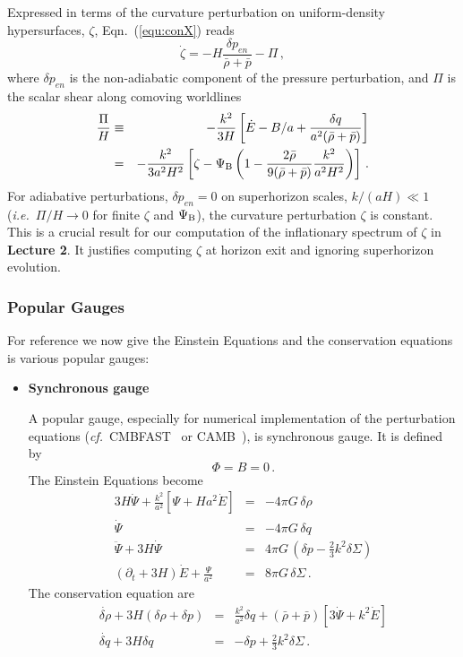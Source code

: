 \documentclass[12pt,letterpaper,rotate]{article}
\def\beq{\begin{equation}}
\def\eeq{\end{equation}}
\begin{document}
{Expressed in terms of the curvature perturbation on uniform-density hypersurfaces, $\zeta$, Eqn.~(\ref{equ:conX}) reads
\beq
\dot \zeta = - H \frac{\delta p_{en}}{\bar \rho + \bar p} - \Pi\, ,
\eeq
where $\delta p_{en}$ is the non-adiabatic component of the pressure perturbation, and $\Pi$ is the scalar shear along comoving worldlines
\begin{eqnarray}
\frac{\Pi}{H} &\equiv& - \frac{k^2}{3H} \left[ \dot E - B/a + \frac{\delta q}{a^2(\bar \rho + \bar p)}\right] \\
&=& - \frac{k^2}{3 a^2 H^2} \left[ \zeta - \Psi_{\rm B} \left(1- \frac{2 \bar \rho}{9(\bar \rho+ \bar p)} \frac{k^2}{a^2 H^2}\right)\right]\, .
\end{eqnarray}
For adiabative perturbations, $\delta p_{en} =0$ on superhorizon scales, $k/(aH) \ll 1$ ({\it i.e.}~$\Pi/H \to 0$ for finite $\zeta$ and $\Psi_{\rm B}$), the curvature perturbation $\zeta$ is constant.
This is a crucial result for our computation of the inflationary spectrum of $\zeta$ in {\bf Lecture 2}. It justifies computing $\zeta$ at horizon exit and ignoring superhorizon evolution.


\subsubsection{Popular Gauges}

For reference we now give the Einstein Equations and the conservation equations is various popular gauges:

\begin{itemize}
\item {\bf Synchronous gauge}

A popular gauge, especially for numerical implementation of the perturbation equations ({\it cf.}~{\sf CMBFAST}~\cite{CMBFAST} or {\sf CAMB}~\cite{CAMB}), is synchronous gauge.
It is defined by 
\beq
\Phi = B=0\, .
\eeq
The Einstein Equations become
\begin{eqnarray}
3H \dot \Psi + \frac{k^2}{a^2} \left[ \Psi + H a^2 \dot E\right] &=& - 4\pi G \, \delta \rho \\
\dot \Psi &=& - 4\pi G \, \delta q \\
\ddot \Psi + 3 H \dot \Psi &=& 4 \pi G\, \left( \delta p - \frac{2}{3} k^2 \delta \Sigma \right) \\
(\partial_t + 3 H) \dot E  + \frac{\Psi }{a^2}&=& 8 \pi G\, \delta \Sigma\, .
\end{eqnarray}
The conservation equation are
\begin{eqnarray}
\label{equ:con}
\dot{\delta \rho} + 3 H (\delta \rho + \delta p) &=& \frac{k^2}{a^2} \delta q + (\bar \rho + \bar p) [3 \dot \Psi + k^2 \dot E ] \\
\dot{\delta q} + 3 H \delta q &=& - \delta p + \frac{2}{3} k^2 \delta \Sigma \, .
\end{eqnarray}


\end{itemize}}
\end{document}
